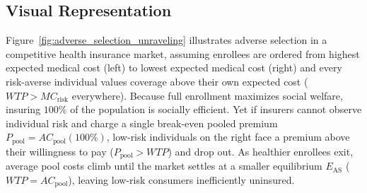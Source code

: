 \documentclass[11pt,letterpaper]{article}
\begin{document}
\subsection*{Visual Representation}
Figure~\ref{fig:adverse_selection_unraveling} illustrates adverse selection in a competitive health insurance market, assuming enrollees are ordered from highest expected medical cost (left) to lowest expected medical cost (right) and every risk-averse individual values coverage above their own expected cost ($WTP > MC_{\text{risk}}$ everywhere). Because full enrollment maximizes social welfare, insuring $100\%$ of the population is socially efficient. Yet if insurers cannot observe individual risk and charge a single break-even pooled premium $P_{\text{pool}} = AC_{\text{pool}}(100\%)$, low-risk individuals on the right face a premium above their willingness to pay ($P_{\text{pool}} > WTP$) and drop out. As healthier enrollees exit, average pool costs climb until the market settles at a smaller equilibrium $E_{\text{AS}}$ ($WTP = AC_{\text{pool}}$), leaving low-risk consumers inefficiently uninsured.
\end{document}
